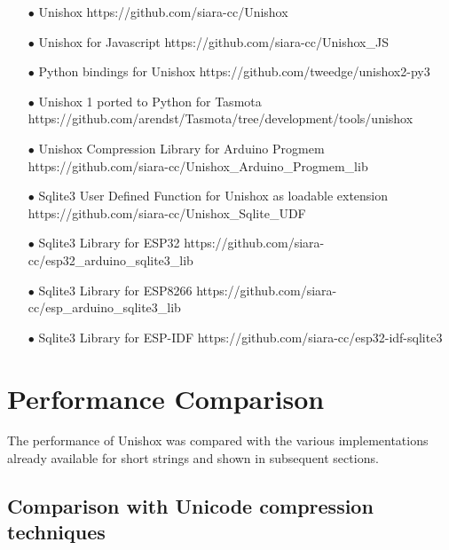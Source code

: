 \documentclass[]{article}
\begin{document}
\begin{itemize}
	\item[$\bullet$] Unishox \newline https://github.com/siara-cc/Unishox
	\item[$\bullet$] Unishox for Javascript \newline https://github.com/siara-cc/Unishox\_JS
	\item[$\bullet$] Python bindings for Unishox \newline https://github.com/tweedge/unishox2-py3
	\item[$\bullet$] Unishox 1 ported to Python for Tasmota \newline https://github.com/arendst/Tasmota/tree/development/tools/unishox
	\item[$\bullet$] Unishox Compression Library for Arduino Progmem \newline https://github.com/siara-cc/Unishox\_Arduino\_Progmem\_lib
	\item[$\bullet$] Sqlite3 User Defined Function for Unishox as loadable extension \newline https://github.com/siara-cc/Unishox\_Sqlite\_UDF
	\item[$\bullet$] Sqlite3 Library for ESP32 \newline https://github.com/siara-cc/esp32\_arduino\_sqlite3\_lib
	\item[$\bullet$] Sqlite3 Library for ESP8266 \newline https://github.com/siara-cc/esp\_arduino\_sqlite3\_lib
	\item[$\bullet$] Sqlite3 Library for ESP-IDF \newline https://github.com/siara-cc/esp32-idf-sqlite3
\end{itemize}

\section{Performance Comparison}

The performance of Unishox was compared with the various implementations already available for short strings and shown in subsequent sections.

\subsection{Comparison with Unicode compression techniques}
\end{document}
